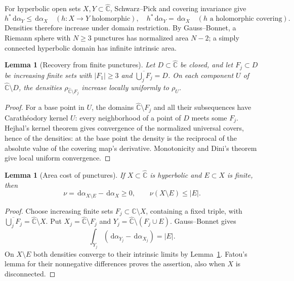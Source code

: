 \documentclass[11pt,reqno]{amsart}
\newcommand{\sphere}{\widehat{\mathbb C}}
\newcommand{\dd}{\,\mathrm d}
\newtheorem{lemma}[theorem]{Lemma}
\theoremstyle{definition}
\numberwithin{equation}{section}
\begin{document}
For hyperbolic open sets $X,Y\subset\sphere$, Schwarz--Pick and covering
invariance give
\[
 h^*\dd\alpha_Y\le\dd\alpha_X\quad(h:X\to Y\text{ holomorphic}),
 \quad h^*\dd\alpha_Y=\dd\alpha_X\quad(h\text{ a holomorphic covering}).
\]
Densities therefore increase under domain restriction. By Gauss--Bonnet,
a Riemann sphere with $N\ge3$ punctures has normalized area $N-2$; a simply
connected hyperbolic domain has infinite intrinsic area.

\begin{lemma}[Recovery from finite punctures]\label{core:kernel}
Let $D\subset\sphere$ be closed, and let $F_j\subset D$ be increasing
finite sets with $|F_1|\ge3$ and
$\overline{\bigcup_jF_j}=D$. On each component $U$ of
$\sphere\setminus D$, the densities $\rho_{\sphere\setminus F_j}$
increase locally uniformly to $\rho_U$.
\end{lemma}
\begin{proof}
For a base point in $U$, the domains $\sphere\setminus F_j$ and all
their subsequences have Carath\'eodory kernel $U$: every neighborhood of
a point of $D$ meets some $F_j$. Hejhal's kernel theorem
\cite[Theorem~1]{Hejhal} gives convergence of the normalized universal
covers, hence of the densities: at the base point the density is the
reciprocal of the absolute value of the covering map's derivative.
Monotonicity and Dini's theorem give local uniform convergence.
\end{proof}

\begin{lemma}[Area cost of punctures]\label{core:puncture}
If $X\subset\sphere$ is hyperbolic and $E\subset X$ is finite, then
\[
 \nu=\dd\alpha_{X\setminus E}-\dd\alpha_X\ge0,
 \qquad \nu(X\setminus E)\le |E|.
\]
\end{lemma}
\begin{proof}
Choose increasing finite sets $F_j\subset\sphere\setminus X$,
containing a fixed triple, with
$\overline{\bigcup_jF_j}=\sphere\setminus X$. Put
$X_j=\sphere\setminus F_j$ and
$Y_j=\sphere\setminus(F_j\cup E)$. Gauss--Bonnet gives
\[
 \int_{Y_j}(\dd\alpha_{Y_j}-\dd\alpha_{X_j})=|E|.
\]
On $X\setminus E$ both densities converge to their intrinsic limits by
Lemma~\ref{core:kernel}. Fatou's lemma for their nonnegative differences
proves the assertion, also when $X$ is disconnected.
\end{proof}
\end{document}
